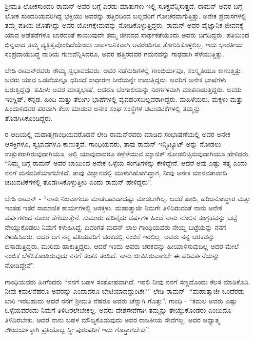 
\chapter{}


ಶ‍್ರೀಮತಿ ಲೋಕಸುಂದರಿ ರಾಮನ್ ಅವರ ಬಗ್ಗೆ ಎರಡು ಮಾತುಗಳು ಇಲ್ಲಿ ಸೂಕ್ತವೆನ್ನಿಸುತ್ತದೆ. ರಾಮನ್ ಅವರ ಬಗ್ಗೆ ಲೋಕ ಸುಂದರಿಯವರಿಗಿದ್ದ ಭಕ್ತಿಯು ಅವರನ್ನು ಹತ್ತಿರದಿಂದ ಬಲ್ಲವರಿಗೆ ಗೋಚರವಾಗುತ್ತಿತ್ತು. ಅನೇಕ ಪ್ರವಾಸಗಳಲ್ಲಿ ತಮ್ಮ ಪತಿಯ ಜೊತೆಗಿದ್ದು ಅವರ ಯೋಗಕ್ಷೇಮವನ್ನು ನೋಡಿಕೊಳ್ಳುತ್ತಿದ್ದರು. ರಾಮನ್ ಅವರ ವೈಜ್ಞಾನಿಕ ಜೀವನಕ್ಕೆ ಯಾವ ಅಡೆತಡೆಗಳೂ ಬಾರದಂತೆ ಕಾಯುವುದೇ ತಮ್ಮ ಜೀವನದ ಸಾರ್ಥಕತೆಯೆಂದು ಅವರು ಬಗೆದಿದ್ದರು. ಪತಿಯಿಂದ ಭಿನ್ನವಾದ ತಮ್ಮ ವ್ಯಕ್ತಿತ್ವವೊಂದಿದೆಯೆಂದು ಸಾರ್ವಜನಿಕವಾಗಿ ಅವರೆಂದಿಗೂ ತೋರಿಸಿಕೊಳ್ಳಲಿಲ್ಲ. ಇದು ಭಾರತೀಯ ಸಂಪ್ರದಾಯಬದ್ಧ ನಾರಿಯ ಗುಣವೆನ್ನಿಸಿದರೂ, ಅವರ ಹತ್ತಿರದವರ ಗಮನವನ್ನು ಗಾಢವಾಗಿ ಸೆಳೆಯುತ್ತಿತ್ತು.

ಲೇಡಿ ರಾಮನ್‍ರವರು ಸೌಮ್ಯ ಸ್ವಭಾವದವರು. ಅವರ ನಡೆನುಡಿಗಳಲ್ಲಿ ಗಾಂಭಿರ್ಯವೂ, ಸಂಸ್ಕೃತಿಯೂ ಕಾಣುತ್ತಿತ್ತು. ಅವರು ಯಾವ ಒಡವೆಯನ್ನೂ ಧರಿಸದೆ ಸಾಧಾರಣ ಸೀರೆಯನ್ನೇ ಉಡುತ್ತಿದ್ದರು. ಅವರಿಗೆ ಅನೇಕ ಭಾಷೆಗಳು ಬರುತ್ತಿದ್ದವು. ತಮಿಳು ಅವರ ಮಾತೃಭಾಷೆ, ಆದರೂ ಬೆಂಗಾಲಿಯನ್ನು ನಿರರ್ಗಳವಾಗಿ ಮಾತನಾಡುತ್ತಿದ್ದರು. ಅವರು ಇಂಗ್ಲಿಷ್, ಕನ್ನಡ, ಹಿಂದಿ ಮತ್ತು ತೆಲುಗು ಭಾಷೆಗಳಲ್ಲಿ ವ್ಯವಹರಿಸಬಲ್ಲವರಾಗಿದ್ದರು. ಮಹಿಳೆಯರು, ಮಕ್ಕಳು ಮತ್ತು ಹಿಂದುಳಿದವರ ಪರವಾಗಿ ಕೆಲಸ ಮಾಡುವ ಅನೇಕ ಸಂಘ ಸಂಸ್ಥೆಗಳ ಚಟುವಟಿಕೆಗಳಲ್ಲಿ ತಮ್ಮನ್ನು ತೊಡಗಿಸಿಕೊಂಡಿದ್ದರು.

ರ ಆದಿಯಲ್ಲಿ ಮಹಾತ್ಮಗಾಂಧಿಯವರೊಡನೆ ಲೇಡಿ ರಾಮನ್‍ರವರು ಮಾಡಿದ ಸಂಭಾಷಣೆಯಲ್ಲಿ ಅವರ ಅನೇಕ ಆಸಕ್ತಿಗಳೂ, ಸ್ವಭಾವಗಳೂ ಕಾಣುತ್ತವೆ. ಗಾಂಧಿಯವರು, ತಾವು ರಾಮನ್ ಇನ್ಸ್ಟಿಟ್ಯೂಟ್ ಅನ್ನು ನೋಡಲು ಉತ್ಸುಕರಾಗಿರುವುದಾಗಿಯೂ, ಅಲ್ಲಿ ಯಾವುದಾದರೂ ಕಣ್ಸೆಳೆಯುವ ಮ್ಯಾಜಿಕ್ ನೋಡಲಿಚ್ಛಿಸುವುದಾಗಿಯೂ ಹೇಳಿದರು. “ನಿಮ್ಮ ಬಗ್ಗೆ ರಾಮನ್ ಅವರ ಬಾಯಿಂದ ಅನೇಕ ಒಳ್ಳೆಯ ಸಂಗತಿಗಳನ್ನು ಕೇಳಿದ್ದೇನೆ. ಆದರೆ ಅವು ಎಷ್ಟು ಸತ್ಯ ಎಂದು ನನಗೆ ಮನವರಿಕೆಯಾಗಬೇಕಿದೆ. ತಾವು ವಿಜ್ಞಾನದಲ್ಲಿ ಮುಳುಗಿಹೋಗಿದ್ದಾಗ, ನೀವು ಅನೇಕ ಮಾನವತಾವಾದಿ ಚಟುವಟಿಕೆಗಳಲ್ಲಿ ತೊಡಗಿಸಿಕೊಳ್ಳುತ್ತೀರಿ ಎಂದು ರಾಮನ್ ಹೇಳಿದ್ದರು”.

ಲೇಡಿ ರಾಮನ್ - “ನಾನು ನಿಜವಾಗಲೂ ಮಾಡಬಹುದಾದಷ್ಟು ಮಾಡಲಾಗಿಲ್ಲ. ಆದರೆ ಖಾದಿ, ಹರಿಜನೋದ್ಧಾರ ಮತ್ತು ಇಂತಹ ಇತರೆ ಸಾಮಾಜಿಕ ಕಾರ್ಯಗಳಲ್ಲಿ ಆಸಕ್ತಳು. ಮಹಾತ್ಮಾಜೀ ನಿಮಗೇ ತಿಳಿದಿರುವಂತೆ ನಾನು ಅನೇಕ ವರ್ಷಗಳಿಂದ ನೂಲು ತೆಗೆಯುತ್ತೇನೆ. ಸುಮಾರು ಹದಿನೈದು ವರ್ಷಗಳ ಹಿಂದೆ ನಾನು ನೂಲಿನ ಸಂಗ್ರಹವನ್ನು ಬಟ್ಟೆ ನೇಯ್ದುಕೊಡಲು ನಿಮಗೆ ಕಳುಹಿಸಿದ್ದೆ. ದಿವಂಗತ ಮದನ್ ಲಾಲ ಗಾಂಧಿಯವರು ನೇಯ್ದ ಬಟ್ಟೆಯನ್ನು ನನಗೆ ಕಳುಹಿಸಿದರು. ಆದರೆ ಆಗ ನನ್ನ ಪತಿಯವರಿಗೆ ಚರಕದಲ್ಲಿ ನಂಬಿಕೆ ಇರಲಿಲ್ಲ. ಅವರು ನನ್ನ ಚರಕವನ್ನು ಬಿಸಾಡುತ್ತಿದ್ದರು, ಮುರಿದು ಹಾಕುತ್ತಿದ್ದರು, ಆದರೆ ಇಂದು ಅವರು ಚರಕವನ್ನು ಹೀಯಾಳಿಸುವುದಿಲ್ಲ ಅದರ ಮೇಲೆ ನಂಬಿಕೆ ಬೆಳೆಸಿಕೊಂಡಿರುವುದು ನನಗೆ ಸಂತಸ ತಂದಿದೆ. ನಾನು ಜೀವಿಸಿರುವಾಗಲೇ ಈ ಪರಿವರ್ತನೆಯನ್ನು ನೋಡಿದ್ದೇನೆ”.

ಗಾಂಧಿಯವರು ಹೀಗೆಂದರು “ನನಗೆ ಬಹಳ ಸಂತೋಷವಾಗಿದೆ. ಇರಲಿ ನೀವು ನನಗೆ ಸಣ್ಣದೊಂದು ಕೆಲಸ ಮಾಡಿಕೊಡಿ. ನೀವು ಕಮಲನೆಹರೂ ಅವರನ್ನು ಎಂದಾದರೂ ಬೇಟಿಯಾದದ್ದುಂಟೇ?” ಲೇಡಿ ರಾಮನ್- “ಮಹಾತ್ಮಾಜೀ ಒಂದೆರಡು ಬಾರಿ ಇರಬಹುದು ಆದರೆ ನನಗೆ ಶ‍್ರೀಮತಿ ನೆಹರೂ ಅವರು ಚೆನ್ನಾಗಿ ಗೊತ್ತು”. ಗಾಂಧಿ - “ಕಮಲ ಅವರು ಎಷ್ಟು ಒಳ್ಳೆಯವರೆಂದು ನಿಮಗೆ ತಿಳಿದಿರಲೇಬೇಕಲ್ಲ. ಅವರು ದೇಶಸೇವೆಗಾಗಿ ತಮ್ಮನ್ನು ತೇಯ್ದುಕೊಂಡರು ಎಂಬುದೂ ತಿಳಿದಿರಬೇಕು. ಆದರೆ ನಾನು ಬಹಳ ಮೌಲ್ಯಕೊಡುವುದು ಅವರ ರಾಜಕೀಯ ಸೇವೆಗಲ್ಲ. ಅವರ ಆಧ್ಯಾತ್ಮ ಸೌಂದರ್ಯಕ್ಕಾಗಿ ಪ್ರತಿಯೊಬ್ಬ ಸ್ತ್ರೀ ಪುರುಷರಿಗೆ ಇದು ಗೊತ್ತಾಗಬೇಕು”.

